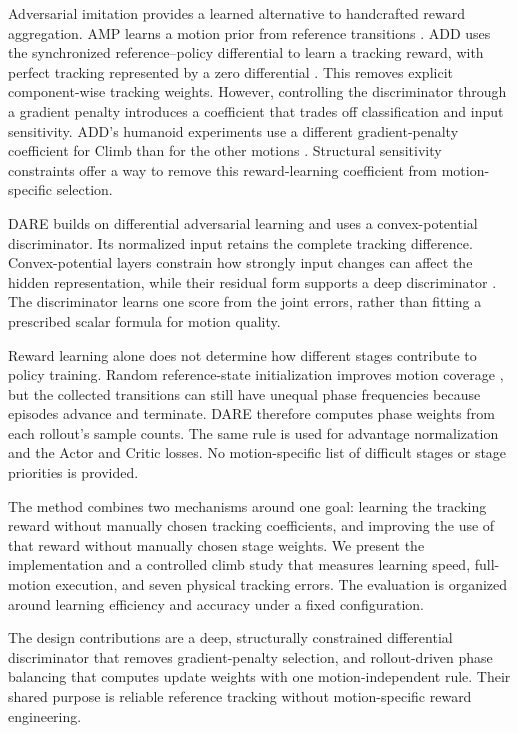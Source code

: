 \documentclass[letterpaper,10pt,conference]{ieeeconf}
\begin{document}
Adversarial imitation provides a learned alternative to handcrafted reward
aggregation. AMP learns a motion prior from reference transitions
\cite{peng2021amp}. ADD uses the synchronized reference--policy differential
to learn a tracking reward, with perfect tracking represented by a zero
differential \cite{zhang2025add}. This removes explicit component-wise
tracking weights. However, controlling the discriminator through a
gradient penalty introduces a coefficient that trades off classification
and input sensitivity. ADD's humanoid experiments use a different
gradient-penalty coefficient for Climb than for the other motions
\cite{zhang2025add}. Structural sensitivity constraints offer a way to
remove this reward-learning coefficient from motion-specific selection.

DARE builds on differential adversarial learning and uses a
convex-potential discriminator. Its normalized input retains the complete
tracking difference. Convex-potential layers constrain how strongly
input changes can affect the hidden representation, while their residual
form supports a deep discriminator \cite{meunier2022cpl}. The discriminator
learns one score from the joint errors, rather than fitting a prescribed
scalar formula for motion quality.

Reward learning alone does not determine how different stages contribute
to policy training. Random reference-state initialization improves motion
coverage \cite{peng2018deepmimic}, but the collected transitions can still
have unequal phase frequencies because episodes advance and terminate.
DARE therefore computes phase weights from each rollout's sample counts.
The same rule is used for advantage normalization and the Actor and Critic
losses. No motion-specific list of difficult stages or stage priorities is
provided.

The method combines two mechanisms around one goal: learning the tracking
reward without manually chosen tracking coefficients, and improving the
use of that reward without manually chosen stage weights. We present the
implementation and a controlled climb study that measures learning speed,
full-motion execution, and seven physical tracking errors. The evaluation
is organized around learning efficiency and accuracy under a fixed
configuration.

The design contributions are a deep, structurally constrained differential
discriminator that removes gradient-penalty selection, and rollout-driven
phase balancing that computes update weights with one motion-independent
rule. Their shared purpose is reliable reference tracking without
motion-specific reward engineering.
\end{document}
